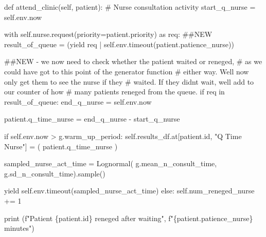 \documentclass[
  letterpaper,
  DIV=11,
  numbers=noendperiod]{scrreprt}
\newenvironment{Shaded}{}{}
\newcommand{\BuiltInTok}[1]{\textcolor[rgb]{0.84,0.23,0.29}{#1}}
\newcommand{\CommentTok}[1]{\textcolor[rgb]{0.42,0.45,0.49}{#1}}
\newcommand{\ControlFlowTok}[1]{\textcolor[rgb]{0.84,0.23,0.29}{#1}}
\newcommand{\DecValTok}[1]{\textcolor[rgb]{0.00,0.36,0.77}{#1}}
\newcommand{\ImportTok}[1]{\textcolor[rgb]{0.01,0.18,0.38}{#1}}
\newcommand{\KeywordTok}[1]{\textcolor[rgb]{0.84,0.23,0.29}{#1}}
\newcommand{\NormalTok}[1]{\textcolor[rgb]{0.14,0.16,0.18}{#1}}
\newcommand{\OperatorTok}[1]{\textcolor[rgb]{0.14,0.16,0.18}{#1}}
\newcommand{\SpecialCharTok}[1]{\textcolor[rgb]{0.00,0.36,0.77}{#1}}
\newcommand{\SpecialStringTok}[1]{\textcolor[rgb]{0.01,0.18,0.38}{#1}}
\newcommand{\StringTok}[1]{\textcolor[rgb]{0.01,0.18,0.38}{#1}}
\newcommand{\VariableTok}[1]{\textcolor[rgb]{0.89,0.38,0.04}{#1}}
\begin{document}
\begin{Shaded}
\begin{Highlighting}[]
\KeywordTok{def}\NormalTok{ attend\_clinic(}\VariableTok{self}\NormalTok{, patient):}
    \CommentTok{\# Nurse consultation activity}
\NormalTok{    start\_q\_nurse }\OperatorTok{=} \VariableTok{self}\NormalTok{.env.now}

    \ControlFlowTok{with} \VariableTok{self}\NormalTok{.nurse.request(priority}\OperatorTok{=}\NormalTok{patient.priority) }\ImportTok{as}\NormalTok{ req:}
        \CommentTok{\#\#NEW}
\NormalTok{        result\_of\_queue }\OperatorTok{=}\NormalTok{ (}\ControlFlowTok{yield}\NormalTok{ req }\OperatorTok{|}
                            \VariableTok{self}\NormalTok{.env.timeout(patient.patience\_nurse))}

        \CommentTok{\#\#NEW {-} we now need to check whether the patient waited or reneged,}
        \CommentTok{\# as we could have got to this point of the generator function}
        \CommentTok{\# either way.  We\textquotesingle{}ll now only get them to see the nurse if they}
        \CommentTok{\# waited.  If they didn\textquotesingle{}t wait, we\textquotesingle{}ll add to our counter of how}
        \CommentTok{\# many patients reneged from the queue.}
        \ControlFlowTok{if}\NormalTok{ req }\KeywordTok{in}\NormalTok{ result\_of\_queue:}
\NormalTok{            end\_q\_nurse }\OperatorTok{=} \VariableTok{self}\NormalTok{.env.now}

\NormalTok{            patient.q\_time\_nurse }\OperatorTok{=}\NormalTok{ end\_q\_nurse }\OperatorTok{{-}}\NormalTok{ start\_q\_nurse}

            \ControlFlowTok{if} \VariableTok{self}\NormalTok{.env.now }\OperatorTok{\textgreater{}}\NormalTok{ g.warm\_up\_period:}
                \VariableTok{self}\NormalTok{.results\_df.at[patient.}\BuiltInTok{id}\NormalTok{, }\StringTok{"Q Time Nurse"}\NormalTok{] }\OperatorTok{=}\NormalTok{ (}
\NormalTok{                    patient.q\_time\_nurse}
\NormalTok{                )}

\NormalTok{            sampled\_nurse\_act\_time }\OperatorTok{=}\NormalTok{ Lognormal(}
\NormalTok{                g.mean\_n\_consult\_time, g.sd\_n\_consult\_time).sample()}

            \ControlFlowTok{yield} \VariableTok{self}\NormalTok{.env.timeout(sampled\_nurse\_act\_time)}
        \ControlFlowTok{else}\NormalTok{:}
            \VariableTok{self}\NormalTok{.num\_reneged\_nurse }\OperatorTok{+=} \DecValTok{1}

            \BuiltInTok{print}\NormalTok{ (}\SpecialStringTok{f"Patient }\SpecialCharTok{\{}\NormalTok{patient}\SpecialCharTok{.}\BuiltInTok{id}\SpecialCharTok{\}}\SpecialStringTok{ reneged after waiting"}\NormalTok{,}
                    \SpecialStringTok{f"}\SpecialCharTok{\{}\NormalTok{patient}\SpecialCharTok{.}\NormalTok{patience\_nurse}\SpecialCharTok{\}}\SpecialStringTok{ minutes"}\NormalTok{)}
\end{Highlighting}
\end{Shaded}
\end{document}
